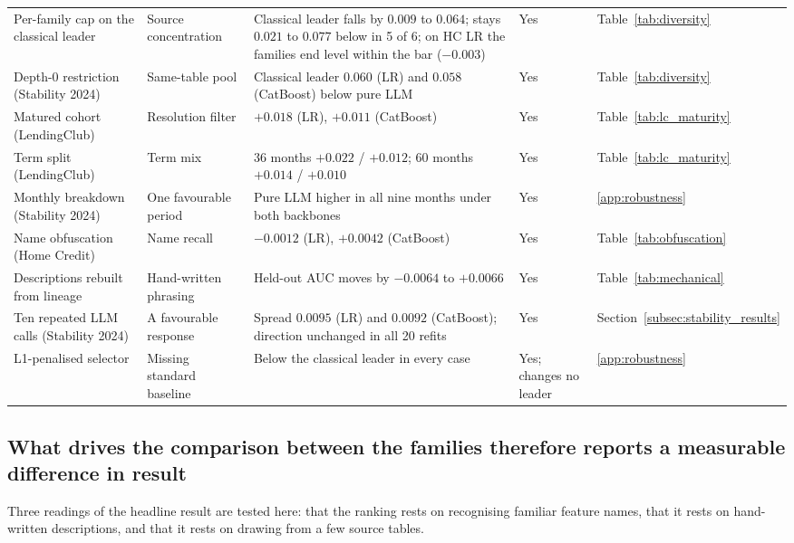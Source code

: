 \documentclass[final,5p,twocolumn]{elsarticle}
\providecommand{\DIFaddtex}[1]{{\protect\color{blue} \sf #1}} %
\providecommand{\DIFdeltex}[1]{{\protect\color{red} \scriptsize #1}} %
\providecommand{\DIFaddbegin}{} %
\providecommand{\DIFaddend}{} %
\providecommand{\DIFdelbegin}{} %
\providecommand{\DIFdelend}{} %
\providecommand{\DIFadd}[1]{\texorpdfstring{\DIFaddtex{#1}}{#1}} %
\providecommand{\DIFdel}[1]{\texorpdfstring{\DIFdeltex{#1}}{}} %
\begin{document}
\begin{table}[htbp]
\begin{threeparttable}
\begin{tabular}{@{}L{30mm}L{24mm}L{\dimexpr\textwidth-30mm-24mm-12mm-27mm-8\tabcolsep\relax}L{12mm}L{27mm}@{}}
\addlinespace
Per-family cap on the classical leader & Source concentration & Classical leader falls by $0.009$ to $0.064$; stays $0.021$ to $0.077$ below in 5 of 6; on HC LR the families end level within the bar ($-0.003$) & Yes & Table~\ref{tab:diversity} \\
\addlinespace
Depth-0 restriction (Stability 2024) & Same-table pool & Classical leader $0.060$ (LR) and $0.058$ (CatBoost) below pure LLM & Yes & Table~\ref{tab:diversity} \\
\addlinespace
Matured cohort (LendingClub) & Resolution filter & $+0.018$ (LR), $+0.011$ (CatBoost) & Yes & Table~\ref{tab:lc_maturity} \\
\addlinespace
Term split (LendingClub) & Term mix & 36 months $+0.022$ / $+0.012$; 60 months $+0.014$ / $+0.010$ & Yes & Table~\ref{tab:lc_maturity} \\
\addlinespace
Monthly breakdown (Stability 2024) & One favourable period & Pure LLM higher in all nine months under both backbones & Yes & \ref{app:robustness} \\
\addlinespace
Name obfuscation (Home Credit) & Name recall & $-0.0012$ (LR), $+0.0042$ (CatBoost) & Yes & Table~\ref{tab:obfuscation} \\
\addlinespace
Descriptions rebuilt from lineage & Hand-written phrasing & Held-out AUC moves by $-0.0064$ to $+0.0066$ & Yes & Table~\ref{tab:mechanical} \\
\addlinespace
Ten repeated LLM calls (Stability 2024) & A favourable response & Spread $0.0095$ (LR) and $0.0092$ (CatBoost); direction unchanged in all 20 refits & Yes & Section~\ref{subsec:stability_results} \\
\addlinespace
L1-penalised selector & Missing standard baseline & Below the classical leader in every case & Yes; changes no leader & \ref{app:robustness} \\
\bottomrule
\end{tabular}
\end{threeparttable}
\end{table}

\subsection{\DIFadd{What drives }\DIFaddend the \DIFdelbegin \DIFdel{comparison between the families therefore reports a measurable difference in }\DIFdelend \DIFaddbegin \DIFadd{result}}
\label{subsec:drivers}

\DIFadd{Three readings of the headline result are tested here: that the ranking rests on recognising familiar feature names, that it rests on hand-written descriptions, and that it rests on drawing from a few source tables.
}
\end{document}
